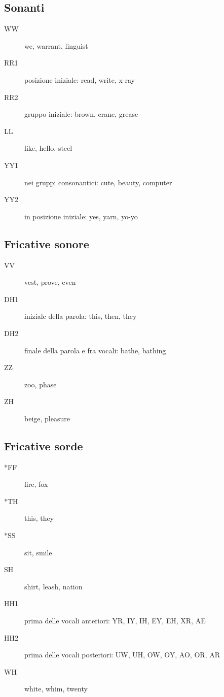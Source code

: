 \subsection{Sonanti}
\begin{description}
\item[WW] we, warrant, linguist
\item[RR1] posizione iniziale: read, write, x-ray
\item[RR2] gruppo iniziale: brown, crane, grease
\item[LL] like, hello, steel
\item[YY1] nei gruppi consonantici: cute, beauty, computer
\item[YY2] in posizione iniziale: yes, yarn, yo-yo
\end{description}

\subsection{Fricative sonore}
\begin{description}
\item[VV] vest, prove, even
\item[DH1] iniziale della parola: this, then, they
\item[DH2] finale della parola e fra vocali: bathe, bathing
\item[ZZ] zoo, phase
\item[ZH] beige, pleasure
\end{description}

\subsection{Fricative sorde}
\begin{description}
\item[*FF] fire, fox
\item[*TH] this, they
\item[*SS] sit, smile
\item[SH] shirt, leash, nation
\item[HH1] prima delle vocali anteriori: YR, IY, IH, EY, EH, XR, AE
\item[HH2] prima delle vocali posteriori: UW, UH, OW, OY, AO, OR, AR
\item[WH] white, whim, twenty
\end{description}


